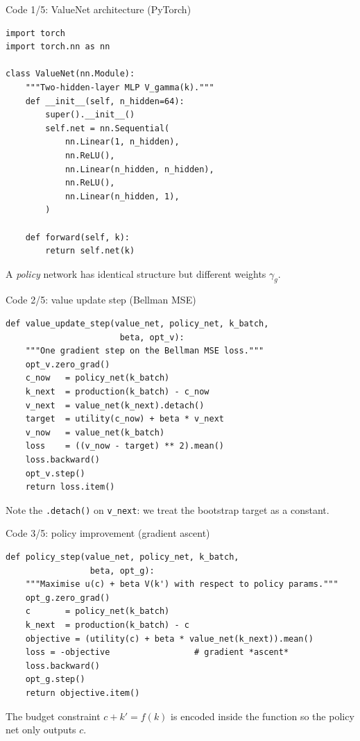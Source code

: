 \documentclass[10pt,english,aspectratio=169]{beamer}
\begin{document}
\begin{frame}[fragile]{Code 1/5: ValueNet architecture (PyTorch)}
\begin{lstlisting}
import torch
import torch.nn as nn

class ValueNet(nn.Module):
    """Two-hidden-layer MLP V_gamma(k)."""
    def __init__(self, n_hidden=64):
        super().__init__()
        self.net = nn.Sequential(
            nn.Linear(1, n_hidden),
            nn.ReLU(),
            nn.Linear(n_hidden, n_hidden),
            nn.ReLU(),
            nn.Linear(n_hidden, 1),
        )

    def forward(self, k):
        return self.net(k)
\end{lstlisting}
\medskip
A \emph{policy} network has identical structure but different weights $\gamma_g$.
\end{frame}

\begin{frame}[fragile]{Code 2/5: value update step (Bellman MSE)}
\begin{lstlisting}
def value_update_step(value_net, policy_net, k_batch,
                       beta, opt_v):
    """One gradient step on the Bellman MSE loss."""
    opt_v.zero_grad()
    c_now   = policy_net(k_batch)
    k_next  = production(k_batch) - c_now
    v_next  = value_net(k_next).detach()
    target  = utility(c_now) + beta * v_next
    v_now   = value_net(k_batch)
    loss    = ((v_now - target) ** 2).mean()
    loss.backward()
    opt_v.step()
    return loss.item()
\end{lstlisting}
\medskip
Note the \texttt{.detach()} on \texttt{v\_next}: we treat the bootstrap target as a constant.
\end{frame}

\begin{frame}[fragile]{Code 3/5: policy improvement (gradient ascent)}
\begin{lstlisting}
def policy_step(value_net, policy_net, k_batch,
                 beta, opt_g):
    """Maximise u(c) + beta V(k') with respect to policy params."""
    opt_g.zero_grad()
    c       = policy_net(k_batch)
    k_next  = production(k_batch) - c
    objective = (utility(c) + beta * value_net(k_next)).mean()
    loss = -objective                 # gradient *ascent*
    loss.backward()
    opt_g.step()
    return objective.item()
\end{lstlisting}
\medskip
The budget constraint $c+k'=f(k)$ is encoded inside the function so the policy net only outputs $c$.
\end{frame}
\end{document}

